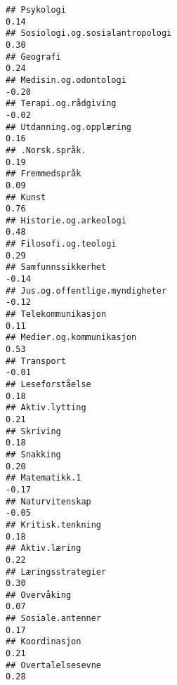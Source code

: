 \documentclass[
]{article}
\begin{document}
\begin{verbatim}
## Psykologi                                                                         0.14
## Sosiologi.og.sosialantropologi                                                    0.30
## Geografi                                                                          0.24
## Medisin.og.odontologi                                                            -0.20
## Terapi.og.rådgiving                                                              -0.02
## Utdanning.og.opplæring                                                            0.16
## .Norsk.språk.                                                                     0.19
## Fremmedspråk                                                                      0.09
## Kunst                                                                             0.76
## Historie.og.arkeologi                                                             0.48
## Filosofi.og.teologi                                                               0.29
## Samfunnssikkerhet                                                                -0.14
## Jus.og.offentlige.myndigheter                                                    -0.12
## Telekommunikasjon                                                                 0.11
## Medier.og.kommunikasjon                                                           0.53
## Transport                                                                        -0.01
## Leseforståelse                                                                    0.18
## Aktiv.lytting                                                                     0.21
## Skriving                                                                          0.18
## Snakking                                                                          0.20
## Matematikk.1                                                                     -0.17
## Naturvitenskap                                                                   -0.05
## Kritisk.tenkning                                                                  0.18
## Aktiv.læring                                                                      0.22
## Læringsstrategier                                                                 0.30
## Overvåking                                                                        0.07
## Sosiale.antenner                                                                  0.17
## Koordinasjon                                                                      0.21
## Overtalelsesevne                                                                  0.28

\end{verbatim}
\end{document}
